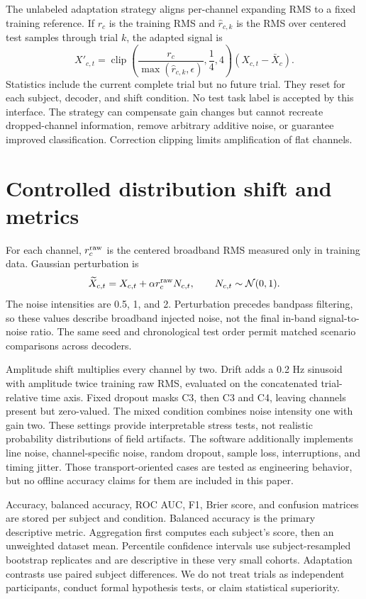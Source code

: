 \documentclass[11pt]{article}
\begin{document}
The unlabeled adaptation strategy aligns per-channel expanding RMS to a fixed training reference. If $r_c$ is the training RMS and $\hat r_{c,k}$ is the RMS over centered test samples through trial $k$, the adapted signal is
\begin{equation}
 X'_{c,t}=\operatorname{clip}\left(\frac{r_c}{\max(\hat r_{c,k},\epsilon)},\frac14,4\right)(X_{c,t}-\bar X_c).
\end{equation}
Statistics include the current complete trial but no future trial. They reset for each subject, decoder, and shift condition. No test task label is accepted by this interface. The strategy can compensate gain changes but cannot recreate dropped-channel information, remove arbitrary additive noise, or guarantee improved classification. Correction clipping limits amplification of flat channels.

\section{Controlled distribution shift and metrics}
For each channel, $r_c^{\rm raw}$ is the centered broadband RMS measured only in training data. Gaussian perturbation is
\begin{equation}
\widetilde X_{c,t}=X_{c,t}+\alpha r_c^{\rm raw}N_{c,t},\qquad N_{c,t}\sim\mathcal N(0,1).
\end{equation}
The noise intensities are 0.5, 1, and 2. Perturbation precedes bandpass filtering, so these values describe broadband injected noise, not the final in-band signal-to-noise ratio. The same seed and chronological test order permit matched scenario comparisons across decoders.

Amplitude shift multiplies every channel by two. Drift adds a 0.2 Hz sinusoid with amplitude twice training raw RMS, evaluated on the concatenated trial-relative time axis. Fixed dropout masks C3, then C3 and C4, leaving channels present but zero-valued. The mixed condition combines noise intensity one with gain two. These settings provide interpretable stress tests, not realistic probability distributions of field artifacts. The software additionally implements line noise, channel-specific noise, random dropout, sample loss, interruptions, and timing jitter. Those transport-oriented cases are tested as engineering behavior, but no offline accuracy claims for them are included in this paper.

Accuracy, balanced accuracy, ROC AUC, F1, Brier score, and confusion matrices are stored per subject and condition. Balanced accuracy is the primary descriptive metric. Aggregation first computes each subject's score, then an unweighted dataset mean. Percentile confidence intervals use \BootstrapSamples{} subject-resampled bootstrap replicates and are descriptive in these very small cohorts. Adaptation contrasts use paired subject differences. We do not treat trials as independent participants, conduct formal hypothesis tests, or claim statistical superiority.
\end{document}
